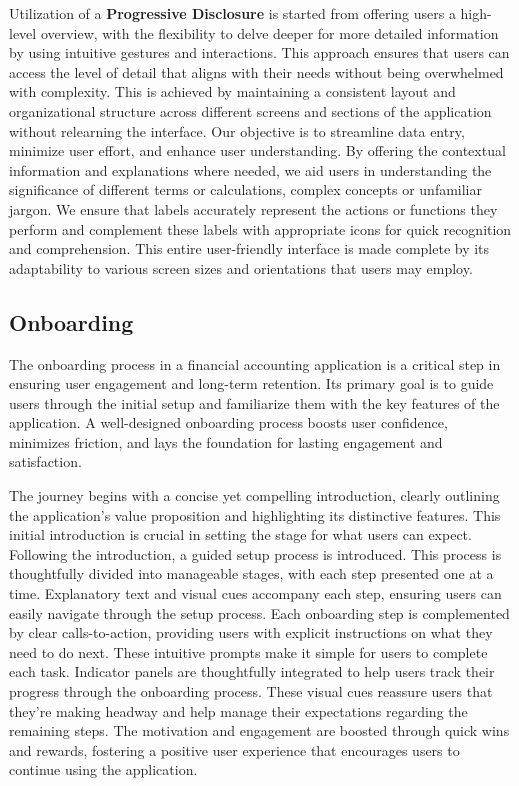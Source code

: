 Utilization of a \textbf{Progressive Disclosure} is started from offering users a high-level overview, with the 
flexibility to delve deeper for more detailed information by using intuitive gestures and interactions. This approach 
ensures that users can access the level of detail that aligns with their needs without being overwhelmed with complexity. 
This is achieved by maintaining a consistent layout and organizational structure across different screens and sections 
of the application without relearning the interface. Our objective is to streamline data entry, minimize user effort, 
and enhance user understanding. By offering the contextual information and explanations where needed, we aid users in 
understanding the significance of different terms or calculations, complex concepts or unfamiliar jargon. We ensure 
that labels accurately represent the actions or functions they perform and complement these labels with appropriate 
icons for quick recognition and comprehension. This entire user-friendly interface is made complete by its adaptability 
to various screen sizes and orientations that users may employ.


\subsection{Onboarding}

The onboarding process in a financial accounting application is a critical step in ensuring user engagement and 
long-term retention. Its primary goal is to guide users through the initial setup and familiarize them with the 
key features of the application. A well-designed onboarding process boosts user confidence, minimizes friction, and 
lays the foundation for lasting engagement and satisfaction.

The journey begins with a concise yet compelling introduction, clearly outlining the application's value proposition 
and highlighting its distinctive features. This initial introduction is crucial in setting the stage for what users 
can expect. Following the introduction, a guided setup process is introduced. This process is thoughtfully divided 
into manageable stages, with each step presented one at a time. Explanatory text and visual cues accompany each step, 
ensuring users can easily navigate through the setup process. Each onboarding step is complemented by clear 
calls-to-action, providing users with explicit instructions on what they need to do next. These intuitive prompts 
make it simple for users to complete each task. Indicator panels are thoughtfully integrated to help users track 
their progress through the onboarding process. These visual cues reassure users that they're making headway and help 
manage their expectations regarding the remaining steps. The motivation and engagement are boosted through quick wins 
and rewards, fostering a positive user experience that encourages users to continue using the application.

